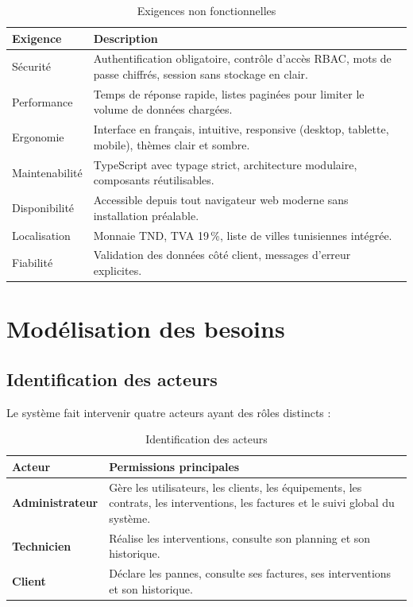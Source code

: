 \begin{table}[H]
\centering
\caption{Exigences non fonctionnelles}
\label{tab:ch2:exigences_nf}
\begin{tabular}{|p{3cm}|p{11.5cm}|}
\hline
\textbf{Exigence} & \textbf{Description} \\
\hline
Sécurité & Authentification obligatoire, contrôle d'accès RBAC, mots de passe chiffrés, session sans stockage en clair. \\
\hline
Performance & Temps de réponse rapide, listes paginées pour limiter le volume de données chargées. \\
\hline
Ergonomie & Interface en français, intuitive, responsive (desktop, tablette, mobile), thèmes clair et sombre. \\
\hline
Maintenabilité & TypeScript avec typage strict, architecture modulaire, composants réutilisables. \\
\hline
Disponibilité & Accessible depuis tout navigateur web moderne sans installation préalable. \\
\hline
Localisation & Monnaie TND, TVA 19\,\%, liste de villes tunisiennes intégrée. \\
\hline
Fiabilité & Validation des données côté client, messages d'erreur explicites. \\
\hline
\end{tabular}
\end{table}

\section{Modélisation des besoins}

\subsection{Identification des acteurs}

Le système fait intervenir quatre acteurs ayant des rôles distincts :

\begin{table}[H]
\centering
\caption{Identification des acteurs}
\label{tab:ch2:acteurs}
\begin{tabular}{|p{3.2cm}|p{7.5cm}|}
\hline
\textbf{Acteur} & \textbf{Permissions principales} \\
\hline
\textbf{Administrateur}
  & Gère les utilisateurs, les clients, les équipements, les contrats, les interventions, les factures et le suivi global du système. \\
\hline
\textbf{Technicien}
  & Réalise les interventions, consulte son planning et son historique. \\
\hline
\textbf{Client}
  & Déclare les pannes, consulte ses factures, ses interventions et son historique. \\
\hline
\end{tabular}
\end{table}

